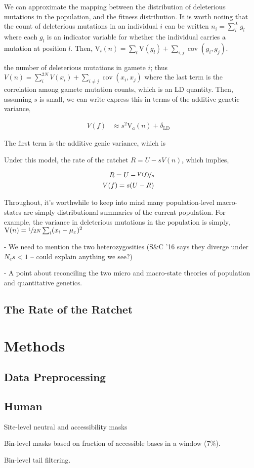 \documentclass[11pt]{article}
\newcommand{\V}{\text{V}}
\DeclareMathOperator{\cov}{cov}
\begin{document}
We can approximate the mapping between the distribution of deleterious
mutations in the population, and the fitness distribution. It is worth noting
that the count of deleterious mutations in an individual $i$ can be written
$n_i = \sum_l^{L} g_l$ where each $g_l$ is an indicator variable for whether
the individual carries a mutation at position $l$. Then, $\V_i(n) = \sum_l
\V(g_l) + \sum_{i,j}\cov(g_i, g_j)$.

the
number of deleterious mutations in gamete $i$; thus $V(n) = \sum_i^{2N} V(x_i)
+ \sum_{i \ne j} \cov(x_i, x_j)$ where the last term is the correlation among
gamete mutation counts, which is an LD quantity. Then, assuming $s$ is small,
we can write express this in terms of the additive genetic variance, 

\begin{align}
  V(f) &\approx s^2 \V_a(n) + \delta_\text{LD}
\end{align}

The first term is the additive genic variance, which is 


Under this model, the rate of the ratchet $R = U  - s V(n)$, which implies,

\begin{align}
  R = U - \nicefrac{V(f)}{s} \\
  V(f) = s(U - R)
\end{align}



Throughout, it's worthwhile to keep into mind many population-level
macro-states are simply distributional summaries of the current population. For
example, the variance in deleterious mutations in the population is simply,
$\V(n) = \nicefrac{1}{2N} \sum_i (x_i - \mu_x)^2$





- We need to mention the two heterozygosities (S\&C '16 says they diverge under
$N_e s < 1$ -- could explain anything we see?)

- A point about reconciling the two micro and macro-state theories of
population and quantitative genetics.





\subsection*{The Rate of the Ratchet}


\section*{Methods}

\subsection*{Data Preprocessing}

\subsection*{Human}

Site-level neutral and accessibility masks

Bin-level masks based on fraction of accessible bases in a window (7\%).

Bin-level tail filtering.

\printbibliography
\end{document}
